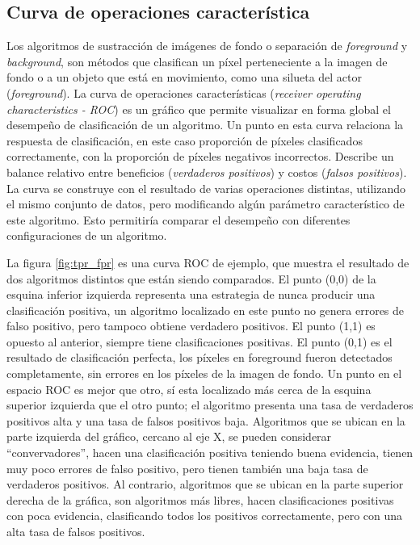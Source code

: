 \subsection{Curva de operaciones característica}
Los algoritmos de sustracción de imágenes de fondo o separación de \emph{foreground} y \emph{background}, son métodos que clasifican un píxel perteneciente a la imagen de fondo o a un objeto que está en movimiento, como una silueta del actor (\emph{foreground}). La curva de operaciones características (\textit{receiver operating characteristics - ROC}) es un gráfico que permite visualizar en forma global el desempeño de clasificación de un algoritmo. Un punto en esta curva relaciona la respuesta de clasificación, en este caso proporción de píxeles clasificados correctamente, con la proporción de píxeles negativos incorrectos. Describe un balance relativo entre beneficios (\emph{verdaderos positivos}) y costos (\emph{falsos positivos}). La curva se construye con el resultado de varias operaciones distintas, utilizando el mismo conjunto de datos, pero modificando algún parámetro característico de este algoritmo. Esto permitiría comparar el desempeño con diferentes configuraciones de un algoritmo.

La figura \ref{fig:tpr_fpr} es una curva ROC de ejemplo, que muestra el resultado de dos algoritmos distintos que están siendo comparados. El punto (0,0) de la esquina inferior izquierda representa una estrategia de nunca producir una clasificación positiva, un algoritmo localizado en este punto no genera errores de falso positivo, pero tampoco obtiene verdadero positivos. El punto (1,1) es opuesto al anterior, siempre tiene clasificaciones positivas. El punto (0,1) es el resultado de clasificación perfecta, los píxeles en foreground fueron detectados completamente, sin errores en los píxeles de la imagen de fondo. Un punto en el espacio ROC es mejor que otro, sí esta localizado más cerca de la esquina superior izquierda que el otro punto; el algoritmo presenta una tasa de verdaderos positivos alta y una tasa de falsos positivos baja. Algoritmos que se ubican en la parte izquierda del gráfico, cercano al eje X, se pueden considerar ``convervadores'', hacen una clasificación positiva teniendo buena evidencia, tienen muy poco errores de falso positivo, pero tienen también una baja tasa de verdaderos positivos. Al contrario, algoritmos que se ubican en la parte superior derecha de la gráfica, son algoritmos más libres, hacen clasificaciones positivas con poca evidencia, clasificando todos los positivos correctamente, pero con una alta tasa de falsos positivos. 




